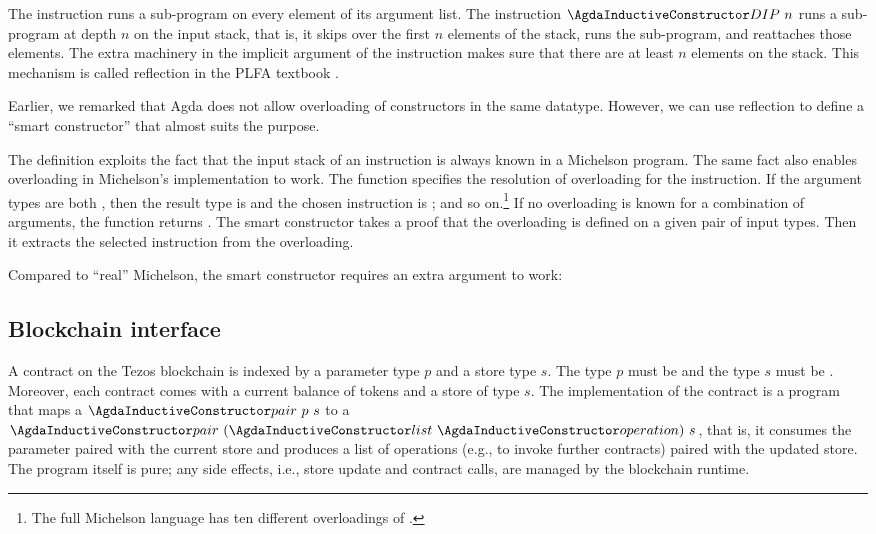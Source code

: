 The instruction  runs a sub-program on every element of its
argument list. The instruction $\ACon{DIP}~n$ runs a sub-program at
depth $n$ on the input stack, that is, it skips over the first $n$
elements of the stack, runs the sub-program, and reattaches those
elements. The extra machinery in the implicit argument of the
instruction makes sure that there are at least $n$ elements on the
stack. This mechanism is called reflection in the  PLFA textbook
\cite{plfa}.

Earlier, we remarked that Agda does not allow overloading of
constructors in the same datatype. However, we can use reflection to
define a ``smart constructor'' that almost suits the purpose.
\SyntaxOverloading

The definition exploits the fact that the input stack of an
instruction is always known in a Michelson program. The same fact also
enables overloading in Michelson's implementation to work.
The function  specifies the resolution of overloading
for the  instruction. If the argument types are both
, then the result type is  and the chosen instruction is
; and so on.\footnote{The full Michelson language has ten different
  overloadings of .} If no  overloading is known for a combination
of arguments, the function returns .
The smart constructor  takes a proof that the overloading is
defined on a given pair of input types. Then it extracts the selected
instruction from the overloading.

Compared to ``real'' Michelson, the smart constructor requires an
extra argument to work:
\SyntaxOverloadingExample

\subsection{Blockchain interface}
\label{sec:blockchain-interface}

A contract on the Tezos blockchain is indexed by a parameter type $p$
and a store type $s$. The type $p$ must be {\APassable} and the type
$s$ must be {\AStorable}. Moreover, each contract comes with a current
balance of tokens and a store of type $s$. The implementation of the
contract is a program that maps a $\ACon{pair}~p~s$ to a
$\ACon{pair}~(\ACon{list}~\Aoperation)~s$, that is, it consumes the
parameter paired with the current store and produces a list of operations (e.g., to invoke further
contracts) paired with the updated store. The program itself is pure;
any side effects, i.e., store update and contract calls, are managed
by the blockchain runtime.
\ConcreteContract

